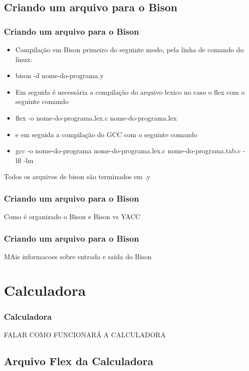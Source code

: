 \documentclass{beamer}
\begin{document}
\subsection{Criando um arquivo para o Bison}

\begin{frame}
\frametitle{Criando um arquivo para o Bison}
	\begin{itemize} 				%
	    \item<1->   Compilação em Bison primeiro do seguinte modo, pela linha de comando do linux:	%
	    \item<2-> bison -d nome-do-programa.y
	    \item<3-> Em seguida é necessária a compilação do arquivo lexico no caso o flex com o seguinte comando\:
	    \item<4-> flex -o nome-do-programa.lex.c nome-do-programa.lex
	    \item<5-> e em seguida a compilação do GCC com o seguinte comando 
	    \item<6-> gcc -o nome-do-programa nome-do-programa.lex.c nome-do-programa.tab.c -lfl -lm
    \end{itemize}
	Todos os arquivos de bison são terminados em .y

\end{frame}

\begin{frame}
\frametitle{Criando um arquivo para o Bison}
		Como é organizado o Bison e Bison vs YACC
	
\end{frame}

\begin{frame}
\frametitle{Criando um arquivo para o Bison}
	MAis informacoes sobre entrada e saida do Bison	
	
\end{frame}
\section{Calculadora}
\begin{frame}
\frametitle{Calculadora}
FALAR COMO FUNCIONARÁ A CALCULADORA
\end{frame}

\subsection{Arquivo Flex da Calculadora}
\end{document}

